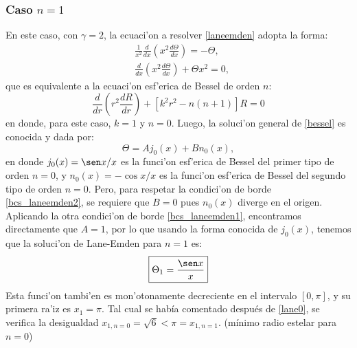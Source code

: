 \subsubsection{Caso \texorpdfstring{$n=1$}{n1}}
En este caso, con $\gamma=2$, la ecuaci'on a resolver \eqref{laneemden} adopta la forma:
\begin{align}
&\frac{1}{x^2}\frac{d}{dx}\left(x^2\frac{d\Theta}{dx}\right)=-\Theta,\\
&\frac{d}{dx}\left(x^2\frac{d\Theta}{dx}\right)+\Theta x^2=0,\label{bessel}
\end{align}
que es equivalente a la ecuaci'on esf'erica de Bessel de orden $n$:
\begin{equation}
 \frac{d}{dr}\left(r^2\frac{dR}{dr}\right)+\left[k^2 r^2-n(n+1)\right]R=0
\end{equation}
en donde, para este caso, $k=1$ y $n=0$. Luego, la soluci'on general de \eqref{bessel} es conocida y dada por:
\begin{equation}
 \Theta=Aj_0(x)+Bn_0(x),
\end{equation}
en donde $j_0(x)=\sen x/x$ es la funci'on esf'erica de Bessel del primer tipo de orden $n=0$, y $n_0(x)=-\cos x/x$ es la funci'on esf'erica de Bessel del segundo tipo de orden $n=0$. Pero, para respetar la condici'on de borde \eqref{bcs_laneemden2}, se requiere que  $B=0$ pues $n_0(x)$ diverge en el origen. Aplicando la otra condici'on de borde \eqref{bcs_laneemden1}, encontramos directamente que $A=1$, por lo que usando la forma conocida de $j_0(x)$, tenemos que la soluci'on de Lane-Emden para $n=1$ es:
\begin{equation}\label{lane1}
 \boxed{\Theta_1=\frac{\sen x}{x}}
\end{equation}
Esta funci'on tambi'en es mon'otonamente decreciente en el intervalo $[0,\pi]$, y su primera ra'iz es $x_1=\pi$. Tal cual se hab\'ia comentado despu\'es de \eqref{lane0}, se verifica la desigualdad $x_{1,n=0}=\sqrt{6}<\pi=x_{1,n=1}.$ (m\'inimo radio estelar para $n=0$)


